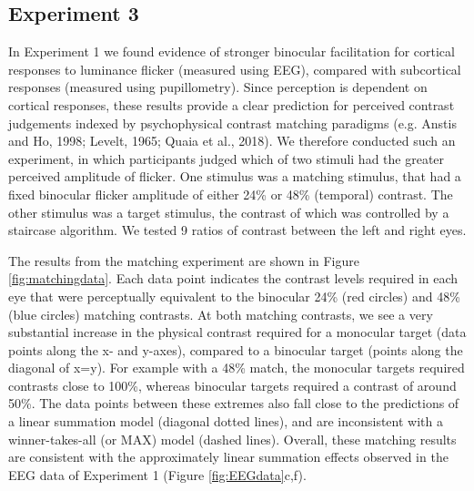 \documentclass[
]{article}
\begin{document}
\hypertarget{experiment-3}{%
\subsection{Experiment 3}\label{experiment-3}}

In Experiment 1 we found evidence of stronger binocular facilitation for cortical responses to luminance flicker (measured using EEG), compared with subcortical responses (measured using pupillometry). Since perception is dependent on cortical responses, these results provide a clear prediction for perceived contrast judgements indexed by psychophysical contrast matching paradigms (e.g. Anstis and Ho, 1998; Levelt, 1965; Quaia et al., 2018). We therefore conducted such an experiment, in which participants judged which of two stimuli had the greater perceived amplitude of flicker. One stimulus was a matching stimulus, that had a fixed binocular flicker amplitude of either 24\% or 48\% (temporal) contrast. The other stimulus was a target stimulus, the contrast of which was controlled by a staircase algorithm. We tested 9 ratios of contrast between the left and right eyes.

The results from the matching experiment are shown in Figure \ref{fig:matchingdata}. Each data point indicates the contrast levels required in each eye that were perceptually equivalent to the binocular 24\% (red circles) and 48\% (blue circles) matching contrasts. At both matching contrasts, we see a very substantial increase in the physical contrast required for a monocular target (data points along the x- and y-axes), compared to a binocular target (points along the diagonal of x=y). For example with a 48\% match, the monocular targets required contrasts close to 100\%, whereas binocular targets required a contrast of around 50\%. The data points between these extremes also fall close to the predictions of a linear summation model (diagonal dotted lines), and are inconsistent with a winner-takes-all (or MAX) model (dashed lines). Overall, these matching results are consistent with the approximately linear summation effects observed in the EEG data of Experiment 1 (Figure \ref{fig:EEGdata}c,f).
\end{document}
